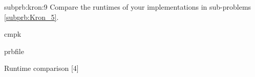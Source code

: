 \begin{samproblem}
\begin{subproblem}{subprb:kron:9}
  Compare the runtimes of your implementations in sub-problems \ref{subprb:Kron_5}.

\begin{samwriteprbpart}{cmpk}
  \begin{writeverbatim}{prbfile}
    \begin{samsolution}
      \begin{samcode}[C++11-code]{}{Runtime comparison}
        [4]
      \end{samcode}

    \end{samsolution}
  \end{writeverbatim}
\end{samwriteprbpart}
\end{subproblem}

\end{samproblem}
